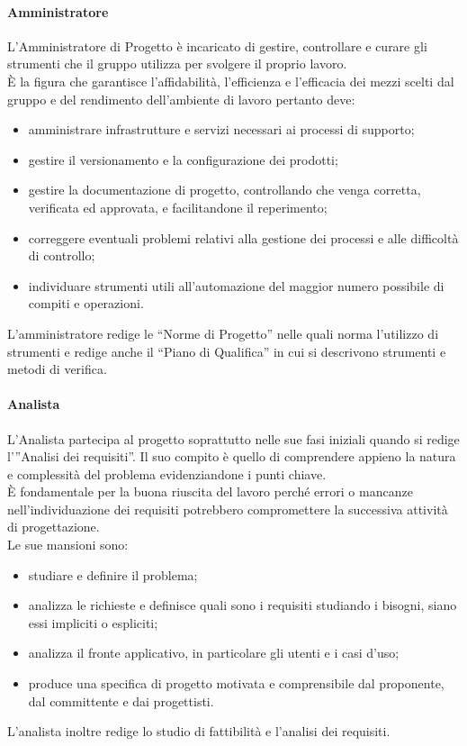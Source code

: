 			\paragraph{Amministratore }
				L’Amministratore di Progetto è incaricato di gestire, controllare e curare gli strumenti che il gruppo utilizza per svolgere il proprio lavoro. \\
				È la figura che garantisce l’affidabilità, l’efficienza e l’efficacia dei mezzi scelti dal gruppo e del rendimento dell’ambiente di lavoro pertanto deve:\\
				\begin{itemize}
					\item amministrare infrastrutture e servizi necessari ai processi di supporto;
					\item gestire il versionamento e la configurazione dei prodotti;
					\item gestire la documentazione di progetto, controllando che venga corretta, verificata ed approvata, e facilitandone il reperimento;
					\item correggere eventuali problemi relativi alla gestione dei processi e alle difficoltà di controllo;
					\item individuare strumenti utili all’automazione del maggior numero possibile di compiti e operazioni.
				\end{itemize}
				L’amministratore redige le “Norme di Progetto” nelle quali norma l’utilizzo di strumenti e redige anche il “Piano di Qualifica” in cui si descrivono strumenti e metodi di verifica.
			\paragraph{Analista  }
				L’Analista partecipa al progetto soprattutto nelle sue fasi iniziali quando si redige l’”Analisi dei requisiti”. Il suo compito è quello di comprendere appieno la natura e complessità del problema evidenziandone i punti chiave. \\
				È fondamentale per la buona riuscita del lavoro perché errori o mancanze nell’individuazione dei requisiti potrebbero compromettere la successiva attività di progettazione.\\
				Le sue mansioni sono:\\
				\begin{itemize}
					\item studiare e definire il problema;
					\item analizza le richieste e definisce quali sono i requisiti studiando i bisogni, siano essi impliciti o espliciti;
					\item analizza il fronte applicativo, in particolare gli utenti e i casi d’uso;
					\item produce una specifica di progetto motivata e comprensibile dal proponente, dal committente e dai progettisti.
				\end{itemize}
				L’analista inoltre redige lo studio di fattibilità e l’analisi dei requisiti.
